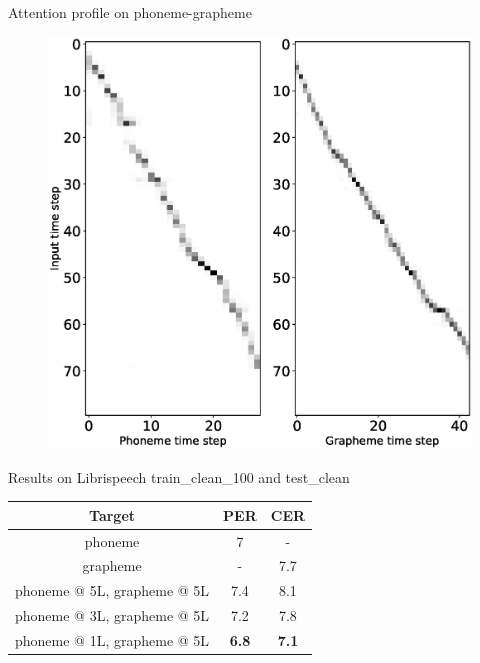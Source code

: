 \documentclass[10pt]{beamer}
\begin{document}
\begin{frame}[fragile]{Attention profile on phoneme-grapheme}
	\begin{center}
	\begin{figure}[!ht]
		
		\includegraphics[height=0.7\textheight]{./results/attention.eps}
		\label{fig:attall}
	\end{figure}
	\end{center}
\end{frame}

\begin{frame}[fragile]{Results on Librispeech train\_clean\_100 and test\_clean}
\begin{center}
	\begin{center}
		\begin{tabular}{|c | c | c|}
			\hline
			Target & PER & CER\\
			\hline\hline
			phoneme & 7 & - \\
			\hline
			grapheme & - & 7.7 \\
			\hline
			phoneme @ 5L, grapheme @ 5L & 7.4 & 8.1 \\
			phoneme @ 3L, grapheme @ 5L & 7.2 & 7.8 \\
			phoneme @ 1L, grapheme @ 5L & \textbf{6.8} & \textbf{7.1} \\
			\hline
		\end{tabular}
	\end{center}
\end{center}
\end{frame}
\end{document}

